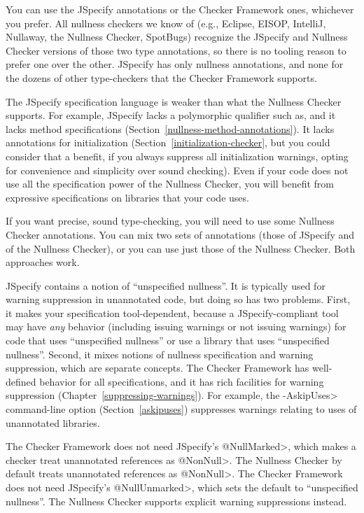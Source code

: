 You can use the JSpecify annotations or the Checker Framework ones,
whichever you prefer.  All nullness checkers we know of (e.g., Eclipse,
EISOP, IntelliJ, Nullaway, the Nullness Checker, SpotBugs) recognize the
JSpecify and Nullness Checker versions of those two type annotations, so
there is no tooling reason to prefer one over the other.  JSpecify has only
nullness annotations, and none for the dozens of other type-checkers that
the Checker Framework supports.

The JSpecify specification language is weaker than what the Nullness
Checker supports.  For example, JSpecify lacks a polymorphic qualifier such
as, and it lacks method
specifications (Section~\ref{nullness-method-annotations}).  It lacks
annotations for initialization (Section~\ref{initialization-checker}, but
you could consider that a benefit, if you always suppress all
initialization warnings, opting for convenience and simplicity over sound
checking).  Even if your code does not use all the specification power of
the Nullness Checker, you will benefit from expressive specifications on
libraries that your code uses.

If you want precise, sound type-checking, you will need to use some
Nullness Checker annotations.  You can mix two sets of annotations (those
of JSpecify and of the Nullness Checker), or you can use just those of the
Nullness Checker.  Both approaches work.

JSpecify contains a notion of ``unspecified nullness''.  It is typically
used for warning suppression in unannotated code, but doing so has two
problems.  First, it makes your specification tool-dependent, because a
JSpecify-compliant tool may have \emph{any} behavior (including issuing
warnings or not issuing warnings) for code that uses ``unspecified
nullness'' or use a library that uses ``unspecified nullness''.  Second, it
mixes notions of nullness specification and warning suppression, which are
separate concepts.  The Checker Framework has well-defined behavior for all
specifications, and it has rich facilities for warning suppression
(Chapter~\ref{suppressing-warnings}).  For example, the \<-AskipUses>
command-line option (Section~\ref{askipuses}) suppresses warnings relating
to uses of unannotated libraries.

The Checker Framework does not need JSpecify's \<@NullMarked>, which makes
a checker treat unannotated references as \<@NonNull>.  The Nullness
Checker by default treats unannotated references as \<@NonNull>.  The
Checker Framework does not need JSpecify's \<@NullUnmarked>, which sets the
default to ``unspecified nullness''.  The Nullness Checker supports
explicit warning suppressions instead.


